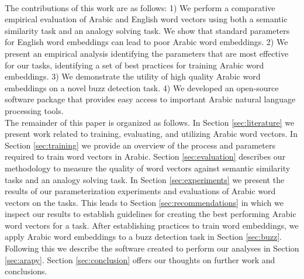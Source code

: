 \\
The contributions of this work are as follows: 1) We perform a comparative empirical evaluation of Arabic and English word vectors using both a semantic similarity task and an analogy solving task. We show that standard parameters for English word embeddings can lead to poor Arabic word embeddings. 2) We present an empirical analysis identifying the parameters that are most effective for our tasks, identifying a set of best practices for training Arabic word embeddings. 3) We demonstrate the utility of high quality Arabic word embeddings on a novel buzz detection task. 4) We developed an open-source software package that provides easy access to important Arabic natural language processing tools. 
\\
The remainder of this paper is organized as follows. In Section \ref{sec:literature} we present work related to training, evaluating, and utilizing Arabic word vectors. In Section \ref{sec:training} we provide an overview of the process and parameters required to train word vectors in Arabic. Section \ref{sec:evaluation} describes our methodology to measure the quality of word vectors against semantic similarity tasks and an analogy solving task. In Section \ref{sec:experiments} we present the results of our parameterization experiments and evaluations of Arabic word vectors on the tasks. This leads to Section \ref{sec:recommendations} in which we inspect our results to establish guidelines for creating the best performing Arabic word vectors for a task. After establishing practices to train word embeddings, we apply Arabic word embeddings to a buzz detection task in Section \ref{sec:buzz}. Following this we describe the software created to perform our analyses in Section \ref{sec:arapy}. Section \ref{sec:conclusion} offers our thoughts on further work and conclusions.
